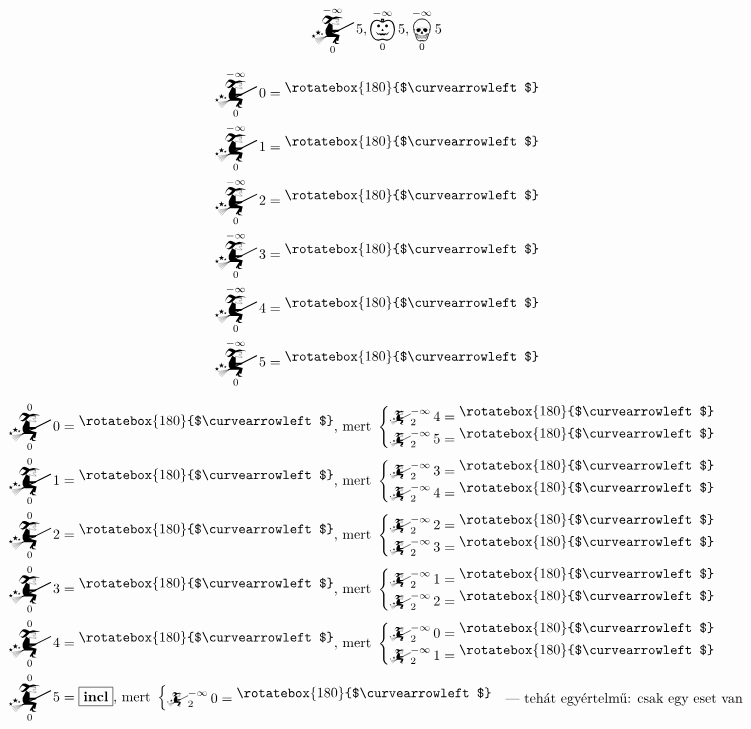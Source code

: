 \documentclass{article}
\newcommand{\nothing}{\text{\raisebox{0.4em}{\rotatebox{180}{$\curvearrowleft$}}}}%
\newcommand{\just}[1]{\boxed{#1}}%
\newcommand{\incl}{\mathbf{incl}}
\newcommand{\mainfun}[3]{\mathwitch_{#1}^{#2}#3}
\newcommand{\yesmainfun}[3]{\bigpumpkin_{#1}^{#2}#3}
\newcommand{\nomainfun}[3]{\bigskull_{#1}^{#2}#3}
\begin{document}
	\[\mainfun0{-\infty}5, \yesmainfun0{-\infty}5, \nomainfun0{-\infty}5\]

	\begin{align*}
		\mainfun0{-\infty}0 &= \nothing \\
		\mainfun0{-\infty}1 &= \nothing \\
		\mainfun0{-\infty}2 &= \nothing \\
		\mainfun0{-\infty}3 &= \nothing \\
		\mainfun0{-\infty}4 &= \nothing \\
		\mainfun0{-\infty}5 &= \nothing
	\end{align*}

	\begin{align*}
		\mainfun0{0}0  &= \nothing    \text{, mert }\begin{cases}\mainfun2{-\infty}4 = \nothing\\\mainfun2{-\infty}5 = \nothing&\end{cases} \\
		\mainfun0{0}1  &= \nothing    \text{, mert }\begin{cases}\mainfun2{-\infty}3 = \nothing\\\mainfun2{-\infty}4 = \nothing&\end{cases} \\
		\mainfun0{0}2  &= \nothing    \text{, mert }\begin{cases}\mainfun2{-\infty}2 = \nothing\\\mainfun2{-\infty}3 = \nothing&\end{cases} \\
		\mainfun0{0}3  &= \nothing    \text{, mert }\begin{cases}\mainfun2{-\infty}1 = \nothing\\\mainfun2{-\infty}2 = \nothing&\end{cases} \\
		\mainfun0{0}4  &= \nothing    \text{, mert }\begin{cases}\mainfun2{-\infty}0 = \nothing\\\mainfun2{-\infty}1 = \nothing&\end{cases} \\
		\mainfun0{0}5  &= \just \incl \text{, mert }\begin{cases}\mainfun2{-\infty}0 = \nothing&\text{--- tehát egyértelmű: csak egy eset van}\end{cases}
	\end{align*}
\end{document}
